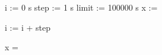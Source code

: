\begin{preproc}
    i := 0 \cdot s
    step := 1 \cdot s
    limit := 100000 \cdot s
    x := 
            \begin{block}
                i := i + step
            \end{block}
    x = \placeholder{}
\end{preproc}

